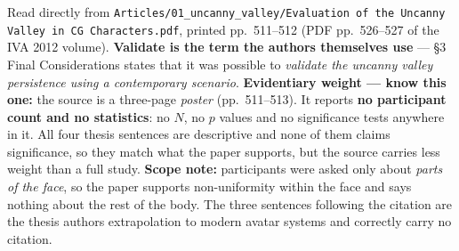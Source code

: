 \documentclass[11pt, a4paper]{article}
\begin{document}
\begin{Form}
  {Read directly from \texttt{\footnotesize Articles/01\_uncanny\_valley/Evaluation of the Uncanny Valley in CG Characters.pdf}, printed pp.~511--512 (PDF pp.~526--527 of the IVA 2012 volume). \textbf{Validate is the term the authors themselves use} --- \S3 Final Considerations states that it was possible to \emph{validate the uncanny valley persistence using a contemporary scenario}. \textbf{Evidentiary weight --- know this one:} the source is a three-page \emph{poster} (pp.~511--513). It reports \textbf{no participant count and no statistics}: no $N$, no $p$ values and no significance tests anywhere in it. All four thesis sentences are descriptive and none of them claims significance, so they match what the paper supports, but the source carries less weight than a full study. \textbf{Scope note:} participants were asked only about \emph{parts of the face}, so the paper supports non-uniformity within the face and says nothing about the rest of the body. The three sentences following the citation are the thesis authors\textquotesingle{} extrapolation to modern avatar systems and correctly carry no citation.}


\end{Form}
\end{document}
